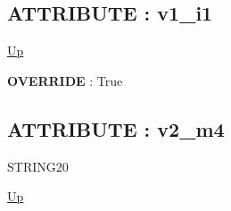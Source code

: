 \subsection*{ATTRIBUTE : v1\_i1}
\hypertarget{ecldoc:intest.inintest.example_2.mod_4.v1_i1}{}
\par
\begin{minipage}[t]{\textwidth}
\begin{flushleft}
  
\end{flushleft}
\end{minipage}
\hyperlink{ecldoc:intest.inintest.example_2.mod_4}{Up} \\
\par
\par
\textbf{OVERRIDE} : True \\
\subsection*{ATTRIBUTE : v2\_m4}
\hypertarget{ecldoc:intest.inintest.example_2.mod_4.v2_m4}{}
\par
\begin{minipage}[t]{\textwidth}
\begin{flushleft}
STRING20  
\end{flushleft}
\end{minipage}
\hyperlink{ecldoc:intest.inintest.example_2.mod_4}{Up} \\
\par
\par


